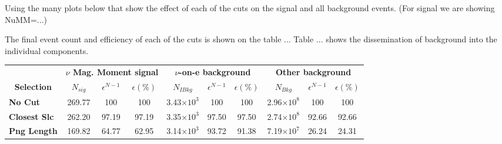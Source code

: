 Using the many plots below that show the effect of each of the cuts on the signal and all background events. (For signal we are showing NuMM=...)

The final event count and efficiency of each of the cuts is shown on the table ... Table ... shows the dissemination of background into the individual components.

\begin{table}[!hb]
\begin{tabular}{|l|ccc|ccc|ccc|}\hline
\multicolumn{1}{|c|}{}                                     & \multicolumn{3}{c|}{\textbf{$\nu$ Mag. Moment signal}}          & \multicolumn{3}{c|}{\textbf{$\nu$-on-e background}}                      & \multicolumn{3}{c|}{\textbf{Other background}}                           \\
\multicolumn{1}{|c|}{\multirow{-2}{*}{\textbf{Selection}}} & \multicolumn{1}{c}{\textbf{$N_{sig}$}} & \textbf{$\epsilon^{N-1}$} & \textbf{$\epsilon \left(\%\right)$} & \multicolumn{1}{c}{\textbf{$N_{IBkg}$}} & \textbf{$\epsilon^{N-1}$} & \textbf{$\epsilon \left(\%\right)$} & \multicolumn{1}{c}{\textbf{$N_{Bkg}$}} & \textbf{$\epsilon^{N-1}$} & \textbf{$\epsilon \left(\%\right)$} \\\hline
\textbf{No Cut}      & 269.77            & 100 & 100 & 3.43$\times 10^3$           & 100 & 100                                     & 2.96$\times 10^8$          & 100                                                             & 100                                    \\
\textbf{Closest Slc} & 262.20            & 97.19                                                              & 97.19                                     & 3.35$\times 10^3$           & 97.50                                                               & 97.50                                      & 2.74$\times 10^8$          & 92.66                                                              & 92.66                                     \\
\textbf{Png Length} & 169.82            & 64.77                                                              & 62.95                                     & 3.14$\times 10^3$           & 93.72                                                               & 91.38                                      & 7.19$\times 10^7$          & 26.24                                                              & 24.31                                     \\

\end{tabular}
\end{table}
